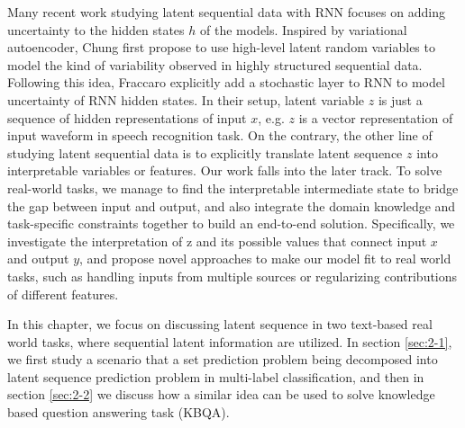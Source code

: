 Many recent work studying latent sequential data with RNN focuses on adding uncertainty to the hidden states $h$ of the models. Inspired by variational autoencoder, Chung \cite{chung2015recurrent} first propose to use high-level latent random variables to model the kind of variability observed in highly structured sequential data. Following this idea, Fraccaro \cite{fraccaro2016sequential} explicitly add a stochastic layer to RNN to model uncertainty of RNN hidden states. In their setup, latent variable $z$ is just a sequence of hidden representations of input $x$, e.g. $z$ is a vector representation of input waveform in speech recognition task. On the contrary, the other line of studying latent sequential data is to explicitly translate latent sequence $z$ into interpretable variables or features. Our work falls into the later track. To solve real-world tasks, we manage to find the interpretable intermediate state to bridge the gap between input and output, and also integrate the domain knowledge and task-specific constraints together to build an end-to-end solution. Specifically, we investigate the interpretation of z and its possible values that connect input $x$ and output $y$, and propose novel approaches to make our model fit to real world tasks, such as handling inputs from multiple sources or regularizing contributions of different features.


In this chapter, we focus on discussing latent sequence in two text-based real world tasks, where sequential latent information are utilized. In section \ref{sec:2-1}, we first study a scenario that a set prediction problem being decomposed into latent sequence prediction problem in multi-label classification, and then in section \ref{sec:2-2} we discuss how a similar idea can be used to solve knowledge based question answering task (KBQA).

